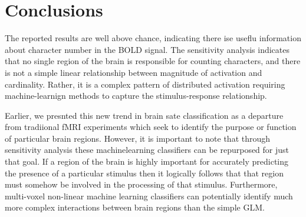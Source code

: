 \documentclass[twocolumn,draft]{article}
\begin{document}
\section{Conclusions}
The reported results are well above chance, indicating there ise useflu information about character number in the BOLD signal.
The sensitivity analysis indicates that no single region of the brain is responsible for counting characters, and there is not a simple linear relationship between magnitude of activation and cardinality.
Rather, it is a complex pattern of distributed activation requiring machine-learnign methods to capture the stimulus-response relationship.

Earlier, we presnted this new trend in brain sate classification as a departure from tradiional fMRI experiments which seek to identify the purpose or function of particular brain regions.
However, it is important to note that through sensitivity analysis these machinelearning classifiers can be repurposed for just that goal.
If a region of the brain is highly important for accurately predicting the presence of a particular stimulus then it logically follows that that region must somehow be involved in the processing of that stimulus.
Furthermore, multi-voxel non-linear machine learning classifiers can potentially identify much more complex interactions between brain regions than the simple GLM.



\end{document}

